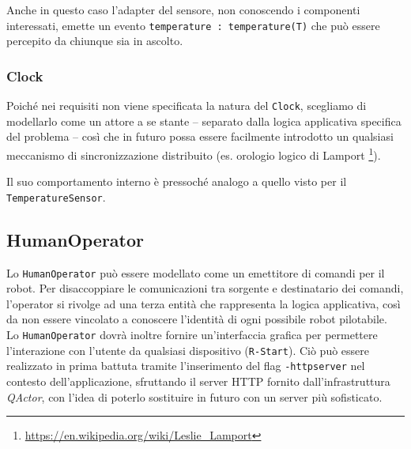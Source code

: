 \documentclass{../llncs}
\newcommand{\codescript}[1]{{\mbox{\small{\texttt{#1}}}}\xspace}
\newcommand{\code}[1]{{\color{blue}\small{\texttt{#1}}}}
\newcommand{\qa}{\textsf{\textit{QActor}}\xspace}
\begin{document}
Anche in questo caso l'adapter del sensore, non conoscendo i componenti interessati, emette un evento \codescript{temperature : temperature(T)} che può essere percepito da chiunque sia in ascolto.\\



\subsubsection{Clock}
Poiché nei requisiti non viene specificata la natura del \texttt{Clock}, scegliamo di modellarlo come un attore a se stante -- separato dalla logica applicativa specifica del problema -- così che in futuro possa essere facilmente introdotto un qualsiasi meccanismo di sincronizzazione distribuito (es. orologio logico di Lamport
\footnote{\url{https://en.wikipedia.org/wiki/Leslie_Lamport}}).



Il suo comportamento interno è pressoché analogo a quello visto per il \texttt{TemperatureSensor}.

\subsection{HumanOperator}
Lo \texttt{HumanOperator} può essere modellato come un emettitore di comandi per il robot. Per disaccoppiare le comunicazioni tra sorgente e destinatario dei comandi, l'operator si rivolge ad una terza entità che rappresenta la logica applicativa, così da non essere vincolato a conoscere l'identità di ogni possibile robot pilotabile.\\



Lo \texttt{HumanOperator} dovrà inoltre fornire un'interfaccia grafica per permettere l'interazione con l'utente da qualsiasi dispositivo (\code{R-Start}). Ciò può essere realizzato in prima battuta tramite l'inserimento del flag \codescript{-httpserver} nel contesto dell'applicazione, sfruttando il server HTTP fornito dall'infrastruttura \qa, con l'idea di poterlo sostituire in futuro con un server più sofisticato.\\
\end{document}
